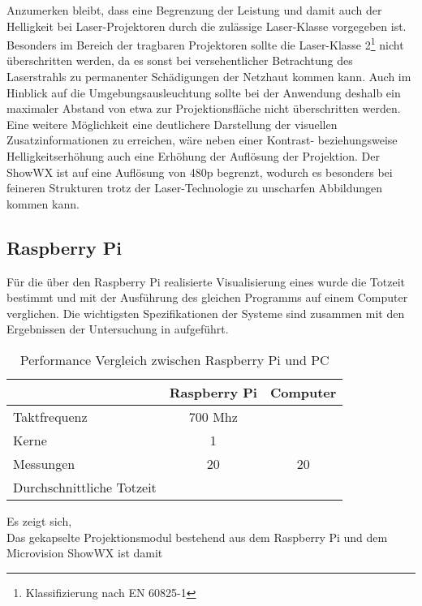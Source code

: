 Anzumerken bleibt, dass eine Begrenzung der Leistung und damit auch der Helligkeit bei Laser-Projektoren durch die zulässige Laser-Klasse vorgegeben ist. Besonders im Bereich der tragbaren Projektoren sollte die Laser-Klasse 2\footnote{Klassifizierung nach EN 60825-1} nicht überschritten werden, da es sonst bei versehentlicher Betrachtung des Laserstrahls zu permanenter Schädigungen der Netzhaut kommen kann. Auch im Hinblick auf die  Umgebungsausleuchtung sollte bei der Anwendung deshalb ein maximaler Abstand von etwa \red[TODO] zur Projektionsfläche nicht überschritten werden.\\

Eine weitere Möglichkeit eine deutlichere Darstellung der visuellen Zusatzinformationen zu erreichen, wäre neben einer Kontrast- beziehungsweise Helligkeitserhöhung auch eine Erhöhung der Auflösung der Projektion. Der ShowWX ist auf eine Auflösung von 480p begrenzt, wodurch es besonders bei feineren Strukturen trotz der Laser-Technologie zu unscharfen Abbildungen kommen kann.\\

\subsection{Raspberry Pi}
Für die über den Raspberry Pi realisierte Visualisierung eines  wurde die Totzeit bestimmt und mit der Ausführung des gleichen Programms auf einem Computer verglichen. Die wichtigsten Spezifikationen der Systeme sind zusammen mit den Ergebnissen der Untersuchung in  aufgeführt.

\begin{table}[ht]
\caption{Performance Vergleich zwischen Raspberry Pi und PC}
\begin{center}
\begin{tabular}{|l|c|c|}
\hline
\rowcolor{lightgray} & \multicolumn{1}{|c|}{\textbf{Raspberry Pi}} & \multicolumn{1}{|c|}{\textbf{Computer}}\\
\hline
Taktfrequenz & 700 Mhz & \\
\hline
Kerne & 1 & \\
\hline
Messungen & 20 & 20\\
\hline
Durchschnittliche Totzeit & & \\
\hline
\end{tabular}
\end{center}
\label{tab.totzeit}
\end{table}

Es zeigt sich, \red[TODO]\\
Das gekapselte Projektionsmodul bestehend aus dem Raspberry Pi und dem Microvision ShowWX ist damit \\

